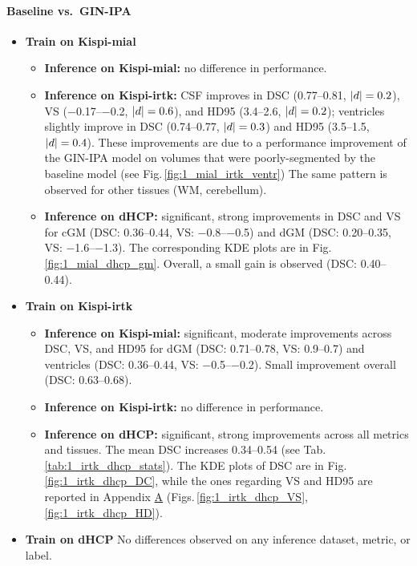 \paragraph{Baseline vs.\ GIN-IPA}
\begin{itemize}
  \item \textbf{Train on Kispi-mial}
  \begin{itemize}
    \item \textbf{Inference on Kispi-mial:} no difference in performance.
    \item \textbf{Inference on Kispi-irtk:} CSF improves in DSC (\numrange[range-open-phrase=from\ ]{0.77}{0.81}, $\lvert d\rvert=0.2$), VS (\numrange[range-open-phrase=from\ ]{-0.17}{-0.2}, $\lvert d\rvert=0.6$), and HD95 (\numrange[range-open-phrase=from\ ]{3.4}{2.6}, $\lvert d\rvert=0.2$); ventricles slightly improve in DSC (\numrange[range-open-phrase=from\ ]{0.74}{0.77}, $\lvert d\rvert=0.3$) and HD95 (\numrange[range-open-phrase=from\ ]{3.5}{1.5}, $\lvert d\rvert=0.4$). These improvements are due to a performance improvement of the GIN-IPA model on volumes that were poorly-segmented by the baseline model (see Fig.\,\ref{fig:1_mial_irtk_ventr}) The same pattern is observed for other tissues (WM, cerebellum).
    \item \textbf{Inference on dHCP:} significant, strong improvements in DSC and VS for cGM (DSC: \numrange[range-open-phrase=from\ ]{0.36}{0.44}, VS: \numrange[range-open-phrase=from\ ]{-0.8}{-0.5}) and dGM (DSC: \numrange[range-open-phrase=from\ ]{0.20}{0.35}, VS: \numrange[range-open-phrase=from\ ]{-1.6}{-1.3}). The corresponding KDE plots are in Fig.\,\ref{fig:1_mial_dhcp_gm}. Overall, a small gain is observed (DSC: \numrange[range-open-phrase=from\ ]{0.40}{0.44}).
  \end{itemize}
  \item \textbf{Train on Kispi-irtk}
  \begin{itemize}
    \item \textbf{Inference on Kispi-mial:} significant, moderate improvements across DSC, VS, and HD95 for dGM (DSC: \numrange[range-open-phrase=from\ ]{0.71}{0.78}, VS: \numrange[range-open-phrase=from\ ]{0.9}{0.7}) and ventricles (DSC: \numrange[range-open-phrase=from\ ]{0.36}{0.44}, VS: \numrange[range-open-phrase=from\ ]{-0.5}{-0.2}). Small improvement overall (DSC: \numrange[range-open-phrase=from\ ]{0.63}{0.68}).
    \item \textbf{Inference on Kispi-irtk:} no difference in performance.
    \item \textbf{Inference on dHCP:} significant, strong improvements across all metrics and tissues. The mean DSC increases \numrange[range-open-phrase=from\ ]{0.34}{0.54} (see Tab.\,\ref{tab:1_irtk_dhcp_stats}). The KDE plots of DSC are in Fig.\,\ref{fig:1_irtk_dhcp_DC}, while the ones regarding VS and HD95 are reported in Appendix \hyperref[app:SupplementaryPlots]{A} (Figs.\,\ref{fig:1_irtk_dhcp_VS}, \ref{fig:1_irtk_dhcp_HD}).
  \end{itemize}
  \item \textbf{Train on dHCP}
  No differences observed on any inference dataset, metric, or label.
\end{itemize}

